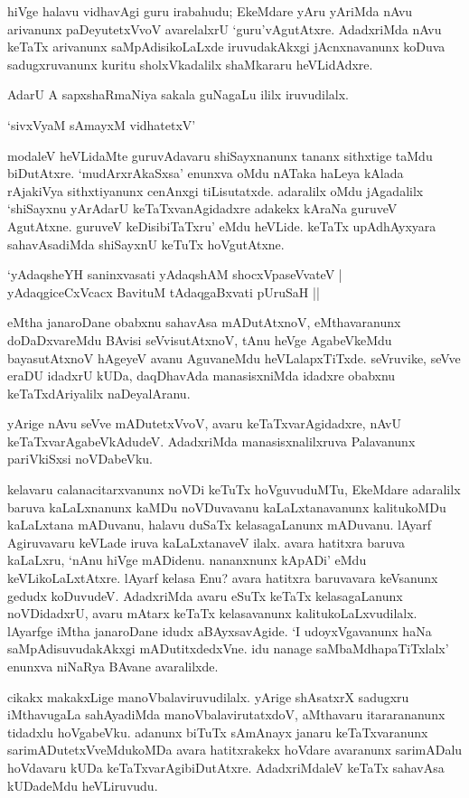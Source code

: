 hiVge halavu vidhavAgi guru irabahudu; EkeMdare yAru yAriMda nAvu arivanunx paDeyutetxVvoV avarelalxrU `guru'vAgutAtxre. AdadxriMda nAvu keTaTx arivanunx saMpAdisikoLaLxde iruvudakAkxgi jAcnxnavanunx koDuva sadugxruvanunx kuritu sholxVkadalilx shaMkararu heVLidAdxre.

AdarU A sapxshaRmaNiya sakala guNagaLu ililx iruvudilalx. 


\begin{shloka}
`sivxVyaM sAmayxM vidhatetxV'
\end{shloka}

modaleV heVLidaMte guruvAdavaru shiSayxnanunx tananx sithxtige taMdu biDutAtxre. `mudArxrAkaSxsa' enunxva oMdu nATaka haLeya kAlada rAjakiVya sithxtiyanunx cenAnxgi tiLisutatxde. adaralilx oMdu jAgadalilx `shiSayxnu yArAdarU keTaTxvanAgidadxre adakekx kAraNa guruveV AgutAtxne. guruveV keDisibiTaTxru' eMdu heVLide. keTaTx upAdhAyxyara sahavAsadiMda shiSayxnU keTuTx hoVgutAtxne.

\begin{shloka}
`yAdaqsheYH saninxvasati yAdaqshAM shocxVpaseVvateV |\\
yAdaqgiceCxVcacx BavituM tAdaqgaBxvati pUruSaH ||
\end{shloka}

eMtha janaroDane obabxnu sahavAsa mADutAtxnoV, eMthavaranunx doDaDxvareMdu BAvisi seVvisutAtxnoV, tAnu heVge AgabeVkeMdu bayasutAtxnoV hAgeyeV avanu AguvaneMdu heVLalapxTiTxde. seVruvike, seVve eraDU idadxrU kUDa, daqDhavAda manasisxniMda idadxre obabxnu keTaTxdAriyalilx naDeyalAranu. 

yArige nAvu seVve mADutetxVvoV, avaru keTaTxvarAgidadxre, nAvU keTaTxvarAgabeVkAdudeV. AdadxriMda manasisxnalilxruva Palavanunx pariVkiSxsi noVDabeVku.

kelavaru calanacitarxvanunx noVDi keTuTx hoVguvuduMTu, EkeMdare adaralilx baruva kaLaLxnanunx kaMDu noVDuvavanu kaLaLxtanavanunx kalitukoMDu kaLaLxtana mADuvanu, halavu duSaTx kelasagaLanunx mADuvanu. lAyarf Agiruvavaru keVLade iruva kaLaLxtanaveV ilalx. avara hatitxra baruva kaLaLxru, `nAnu hiVge mADidenu. nananxnunx kApADi' eMdu keVLikoLaLxtAtxre. lAyarf kelasa Enu? avara hatitxra baruvavara keVsanunx gedudx koDuvudeV. AdadxriMda avaru eSuTx keTaTx kelasagaLanunx noVDidadxrU, avaru mAtarx keTaTx kelasavanunx kalitukoLaLxvudilalx. lAyarfge iMtha janaroDane idudx aBAyxsavAgide. `I udoyxVgavanunx haNa saMpAdisuvudakAkxgi mADutitxdedxVne. idu nanage saMbaMdhapaTiTxlalx' enunxva niNaRya BAvane avaralilxde. 

cikakx makakxLige manoVbalaviruvudilalx. yArige shAsatxrX sadugxru iMthavugaLa sahAyadiMda manoVbalavirutatxdoV, aMthavaru itararananunx tidadxlu hoVgabeVku. adanunx biTuTx sAmAnayx janaru keTaTxvaranunx sarimADutetxVveMdukoMDa avara hatitxrakekx hoVdare avaranunx sarimADalu hoVdavaru kUDa keTaTxvarAgibiDutAtxre. AdadxriMdaleV keTaTx sahavAsa kUDadeMdu heVLiruvudu.

